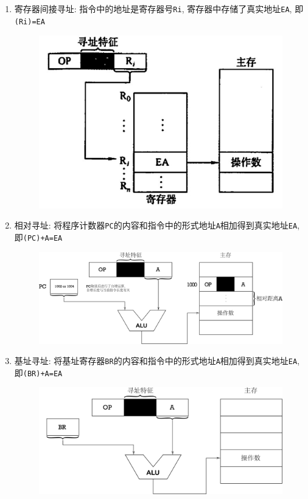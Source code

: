\begin{enumerate}
\begin{figure}[H]
\end{figure}
\item 寄存器间接寻址: 指令中的地址是寄存器号\verb|Ri|, 寄存器中存储了真实地址\verb|EA|, 即\verb|(Ri)=EA|
\begin{figure}[H]
\centering
\includegraphics[scale=.9]{img/figure6.png}
\end{figure}
\item 相对寻址: 将程序计数器\verb|PC|的内容和指令中的形式地址\verb|A|相加得到真实地址\verb|EA|, 即\verb|(PC)+A=EA|
\begin{figure}[H]
\centering
\includegraphics[scale=.9]{img/figure7}
\end{figure}
\item 基址寻址: 将基址寄存器\verb|BR|的内容和指令中的形式地址\verb|A|相加得到真实地址\verb|EA|, 即\verb|(BR)+A=EA|
\begin{figure}[H]
\centering
\includegraphics[scale=.9]{img/figure8}
\end{figure}
\end{enumerate}

